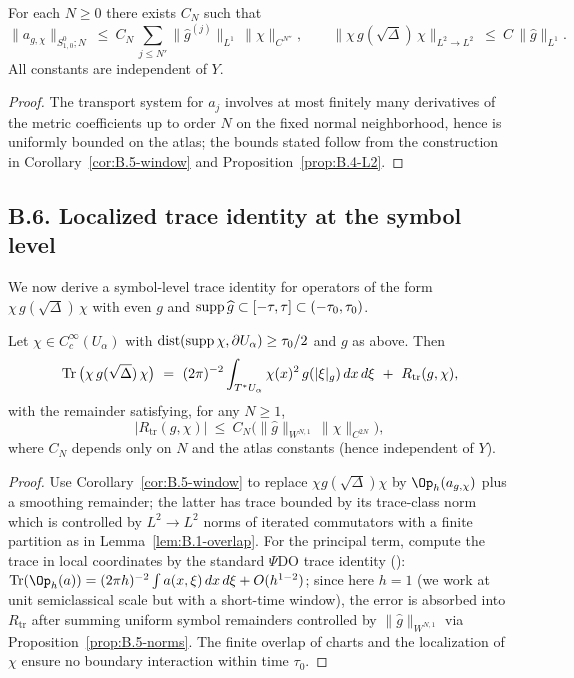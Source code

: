 \begin{proposition}\label{prop:B.5-norms}
For each $N\ge 0$ there exists $C_N$ such that
\[
\|a_{g,\chi}\|_{S^0_{1,0};N}\ \le\ C_N\, \sum_{j\le N'} \|\widehat g^{(j)}\|_{L^1}\, \|\chi\|_{C^{N''}},
\qquad
\|\chi\,g(\sqrt\Delta)\,\chi\|_{L^2\to L^2}\ \le\ C\, \|\widehat g\|_{L^1}.
\]
All constants are independent of $Y$.
\end{proposition}

\begin{proof}
The transport system for $a_j$ involves at most finitely many derivatives of the metric coefficients up to order $N$ on the fixed normal neighborhood, hence is uniformly bounded on the atlas; the bounds stated follow from the construction in Corollary~\ref{cor:B.5-window} and Proposition~\ref{prop:B.4-L2}.
\end{proof}

\subsection*{B.6. Localized trace identity at the symbol level}

\noindent
We now derive a symbol-level trace identity for operators of the form
$\chi\,g(\sqrt\Delta)\,\chi$ with even $g$ and $\operatorname{supp}\widehat g\subset[-\tau,\tau]\subset(-\tau_0,\tau_0)$.

\begin{theorem}\label{thm:B.6-trace}
Let $\chi\in C_c^\infty(U_\alpha)$ with $\operatorname{dist}(\operatorname{supp}\chi,\partial U_\alpha)\ge \tau_0/2$ and
$g$ as above. Then
\[
\Tr\big(\chi\,g(\sqrt\Delta)\,\chi\big)
\ =\ (2\pi)^{-2}\int_{T^*U_\alpha} \chi(x)^2\, g(|\xi|_g)\,dx\,d\xi \ +\ R_{\mathrm{tr}}(g,\chi),
\]
with the remainder satisfying, for any $N\ge 1$,
\[
|R_{\mathrm{tr}}(g,\chi)|\ \le\ C_N \Big( \|\widehat g\|_{W^{N,1}}\,\|\chi\|_{C^{2N}} \Big),
\]
where $C_N$ depends only on $N$ and the atlas constants (hence independent of $Y$).
\end{theorem}

\begin{proof}
Use Corollary~\ref{cor:B.5-window} to replace $\chi g(\sqrt\Delta)\chi$ by $\Op_h(a_{g,\chi})$ plus a smoothing remainder; the latter has trace bounded by its trace-class norm which is controlled by $L^2\to L^2$ norms of iterated commutators with a finite partition as in Lemma~\ref{lem:B.1-overlap}. For the principal term, compute the trace in local coordinates by the standard $\Psi$DO trace identity (\cite[Thm.~9.6]{Zworski}): $\Tr(\Op_h(a))=(2\pi h)^{-2}\int a(x,\xi)\,dx\,d\xi + O(h^{1-2})$; since here $h=1$ (we work at unit semiclassical scale but with a short-time window), the error is absorbed into $R_{\mathrm{tr}}$ after summing uniform symbol remainders controlled by $\|\widehat g\|_{W^{N,1}}$ via Proposition~\ref{prop:B.5-norms}. The finite overlap of charts and the localization of $\chi$ ensure no boundary interaction within time $\tau_0$.
\end{proof}

